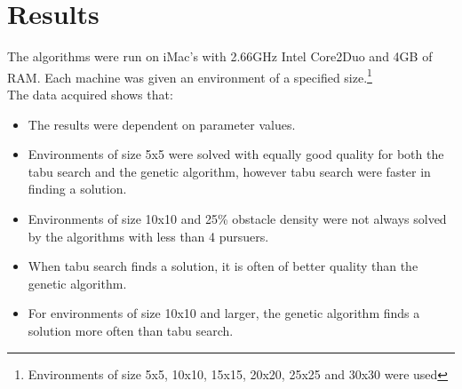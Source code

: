 \chapter{Results}
The algorithms were run on iMac's with 2.66GHz Intel Core2Duo and 4GB of RAM. Each machine was given an environment of a specified size.\footnote{Environments of size 5x5, 10x10, 15x15, 20x20, 25x25 and 30x30 were used}\\
The data acquired shows that:
\begin{itemize}
\item{The results were dependent on parameter values.}
\item{Environments of size 5x5 were solved with equally good quality for both the tabu search and the genetic algorithm, however tabu search were faster in finding a solution.}
\item{Environments of size 10x10 and 25\% obstacle density were not always solved by the algorithms with less than 4 pursuers.}
\item{When tabu search finds a solution, it is often of better quality than the genetic algorithm.}
\item{For environments of size 10x10 and larger, the genetic algorithm finds a solution more often than tabu search.}
\end{itemize}

